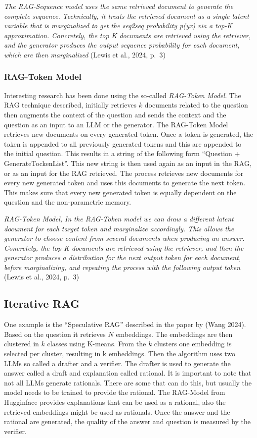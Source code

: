 \documentclass{wseas}
\begin{document}
\emph{The RAG-Sequence model uses the same retrieved document to
generate the complete sequence. Technically, it treats the retrieved
document as a single latent variable that is marginalized to get the
seq2seq probability p(y\textbar x) via a top-K approximation.
Concretely, the top K documents are retrieved using the retriever, and
the generator produces the output sequence probability for each
document, which are then marginalized} (Lewis et al., 2024, p.~3) \cite{cite3}

\subsubsection{RAG-Token Model}

Interesting research has been done using the so-called \emph{RAG-Token
Model}. The RAG technique described, initially retrieves \(k\) documents
related to the question then augments the context of the question and
sends the context and the question as an input to an LLM or the
generator. The RAG-Token Model retrieves new documents on every
generated token. Once a token is generated, the token is appended to all
previously generated tokens and this are appended to the initial
question. This results in a string of the following form ``Question +
GenerateTockenList''. This new string is then used again as an input in
the RAG, or as an input for the RAG retrieved. The process retrieves new
documents for every new generated token and uses this documents to
generate the next token. This makes sure that every new generated token
is equally dependent on the question and the non-parametric memory.

\emph{RAG-Token Model, In the RAG-Token model we can draw a different
latent document for each target token and marginalize accordingly. This
allows the generator to choose content from several documents when
producing an answer. Concretely, the top K documents are retrieved using
the retriever, and then the generator produces a distribution for the
next output token for each document, before marginalizing, and repeating
the process with the following output token} (Lewis et al., 2024, p.~3)
\cite{cite3}

\subsection{Iterative RAG}

One example is the ``Speculative RAG'' described in the paper \cite{cite18}
by (Wang 2024). Based on the question it retrieves \(N\) embeddings. The
embeddings are then clustered in \(k\) classes using K-means. From the
\(k\) clusters one embedding is selected per cluster, resulting in k
embeddings. Then the algorithm uses two LLMs so called a drafter and a
verifier. The drafter is used to generate the answer called a draft and
explanation called rational. It is important to note that not all LLMs
generate rationals. There are some that can do this, but usually the
model needs to be trained to provide the rational. The RAG-Model from
Hugginface provides explanations that can be used as a rational, also
the retrieved embeddings might be used as rationals. Once the answer and
the rational are generated, the quality of the answer and question is
measured by the verifier.
\end{document}
